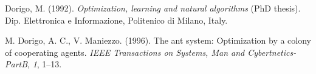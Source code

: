 \documentclass[english,man]{apa6}
\begin{document}
\hypertarget{refs}{}
\hypertarget{ref-Dorigo_1992}{}
Dorigo, M. (1992). \emph{Optimization, learning and natural algorithms}
(PhD thesis). Dip. Elettronica e Informazione, Politenico di Milano,
Italy.

\hypertarget{ref-Dorigo_1996}{}
M. Dorigo, A. C., V. Maniezzo. (1996). The ant system: Optimization by a
colony of cooperating agents. \emph{IEEE Transactions on Systems, Man
and Cybertnetics-PartB}, \emph{1}, 1--13.
\end{document}
